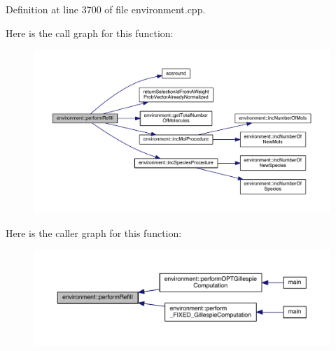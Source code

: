 Definition at line 3700 of file environment.\-cpp.



Here is the call graph for this function\-:
\nopagebreak
\begin{figure}[H]
\begin{center}
\leavevmode
\includegraphics[width=350pt]{a00014_a8a53821ad1675b0da50591616aac3b74_cgraph}
\end{center}
\end{figure}




Here is the caller graph for this function\-:
\nopagebreak
\begin{figure}[H]
\begin{center}
\leavevmode
\includegraphics[width=350pt]{a00014_a8a53821ad1675b0da50591616aac3b74_icgraph}
\end{center}
\end{figure}


